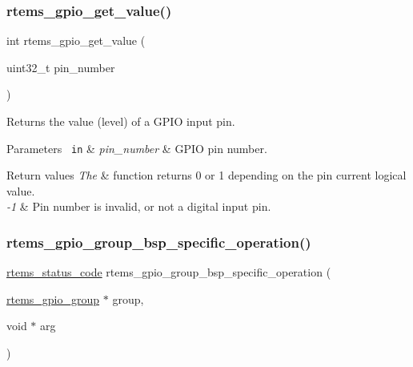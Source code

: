 \subsubsection{\texorpdfstring{rtems\_gpio\_get\_value()}{rtems\_gpio\_get\_value()}}
{\footnotesize\ttfamily int rtems\+\_\+gpio\+\_\+get\+\_\+value (\begin{DoxyParamCaption}\item[{uint32\+\_\+t}]{pin\+\_\+number }\end{DoxyParamCaption})}



Returns the value (level) of a G\+P\+IO input pin. 


\begin{DoxyParams}[1]{Parameters}
\mbox{\texttt{ in}}  & {\em pin\+\_\+number} & G\+P\+IO pin number.\\
\hline
\end{DoxyParams}

\begin{DoxyRetVals}{Return values}
{\em The} & function returns 0 or 1 depending on the pin current logical value. \\
\hline
{\em -\/1} & Pin number is invalid, or not a digital input pin. \\
\hline
\end{DoxyRetVals}
\mbox{\label{gpio-support_8c_a1658da3186e28124ec5fe11f29c4e02a}} 
\subsubsection{\texorpdfstring{rtems\_gpio\_group\_bsp\_specific\_operation()}{rtems\_gpio\_group\_bsp\_specific\_operation()}}
{\footnotesize\ttfamily \mbox{\hyperlink{group__ClassicStatus_ga545d41846817eaba6143d52ee4d9e9fe}{rtems\+\_\+status\+\_\+code}} rtems\+\_\+gpio\+\_\+group\+\_\+bsp\+\_\+specific\+\_\+operation (\begin{DoxyParamCaption}\item[{\mbox{\hyperlink{structrtems__gpio__group}{rtems\+\_\+gpio\+\_\+group}} $\ast$}]{group,  }\item[{void $\ast$}]{arg }\end{DoxyParamCaption})}



